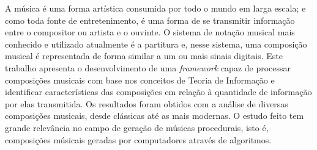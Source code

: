 A música é uma forma artística consumida por todo o mundo em larga escala; e como toda fonte de entretenimento, é uma forma de se transmitir informação entre o compositor ou artista e o ouvinte. O sistema de notação musical mais conhecido e utilizado atualmente é a partitura e, nesse sistema, uma composição musical é representada de forma similar a um ou mais sinais digitais. Este trabalho apresenta o desenvolvimento de uma \textit{framework} capaz de processar composições musicais com base nos conceitos de Teoria de Informação e identificar características das composições em relação à quantidade de informação por elas transmitida. Os resultados foram obtidos com a análise de diversas composições musicais, desde clássicas até as mais modernas. O estudo feito tem grande relevância no campo de geração de músicas procedurais, isto é, composições músicais geradas por computadores através de algoritmos.
